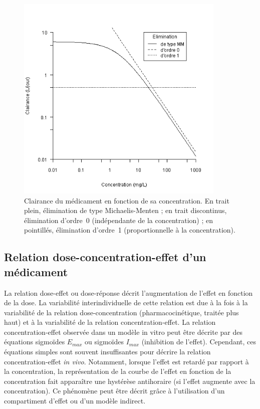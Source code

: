 \begin{figure}[htbp]
	\centering
		\includegraphics[width=10cm]{figures/raster/FIG_8}
	\caption[Clairance du médicament en fonction de sa concentration.]{Clairance du médicament en fonction de sa concentration. En trait plein, élimination de type Michaelis-Menten ; en trait discontinus, élimination d'ordre~0 (indépendante de la concentration) ; en pointillés, élimination d'ordre~1 (proportionnelle à la concentration).}
	\label{fig:8}
\end{figure}

\subsection{Relation dose-concentration-effet d'un médicament}
La relation dose-effet ou dose-réponse décrit l'augmentation de l'effet en fonction de la dose. La variabilité interindividuelle de cette relation est due à la fois à la variabilité de la relation dose-concentration (pharmacocinétique, traitée plus haut) et à la variabilité de la relation concentration-effet. La relation concentration-effet observée dans un modèle in vitro peut être décrite par des équations sigmoïdes $E_{max}$ ou sigmoïdes $I_{max}$ (inhibition de l'effet). Cependant, ces équations simples sont souvent insuffisantes pour décrire la relation concentration-effet \textit{in vivo}. Notamment, lorsque l'effet est retardé par rapport à la concentration, la représentation de la courbe de l'effet en fonction de la concentration fait apparaître une hystérèse antihoraire (si l'effet augmente avec la concentration). Ce phénomène peut être décrit grâce à l'utilisation d'un compartiment d'effet ou d'un modèle indirect.

